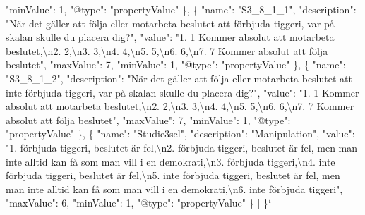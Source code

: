 \documentclass[
]{book}
\newenvironment{Shaded}{\begin{snugshade}}{\end{snugshade}}
\newcommand{\CharTok}[1]{\textcolor[rgb]{0.31,0.60,0.02}{#1}}
\newcommand{\DataTypeTok}[1]{\textcolor[rgb]{0.13,0.29,0.53}{#1}}
\newcommand{\DecValTok}[1]{\textcolor[rgb]{0.00,0.00,0.81}{#1}}
\newcommand{\ErrorTok}[1]{\textcolor[rgb]{0.64,0.00,0.00}{\textbf{#1}}}
\newcommand{\FunctionTok}[1]{\textcolor[rgb]{0.00,0.00,0.00}{#1}}
\newcommand{\OtherTok}[1]{\textcolor[rgb]{0.56,0.35,0.01}{#1}}
\newcommand{\StringTok}[1]{\textcolor[rgb]{0.31,0.60,0.02}{#1}}
\begin{document}
\begin{Shaded}
\begin{Highlighting}[]
      \DataTypeTok{"minValue"}\FunctionTok{:} \DecValTok{1}\FunctionTok{,}
      \DataTypeTok{"@type"}\FunctionTok{:} \StringTok{"propertyValue"}
    \FunctionTok{\}}\OtherTok{,}
    \FunctionTok{\{}
      \DataTypeTok{"name"}\FunctionTok{:} \StringTok{"S3_8_1_1"}\FunctionTok{,}
      \DataTypeTok{"description"}\FunctionTok{:} \StringTok{"När det gäller att följa eller motarbeta beslutet att förbjuda tiggeri, var på skalan skulle du placera dig?"}\FunctionTok{,}
      \DataTypeTok{"value"}\FunctionTok{:} \StringTok{"1. 1 Kommer absolut att motarbeta beslutet,}\CharTok{\textbackslash{}n}\StringTok{2. 2,}\CharTok{\textbackslash{}n}\StringTok{3. 3,}\CharTok{\textbackslash{}n}\StringTok{4. 4,}\CharTok{\textbackslash{}n}\StringTok{5. 5,}\CharTok{\textbackslash{}n}\StringTok{6. 6,}\CharTok{\textbackslash{}n}\StringTok{7. 7 Kommer absolut att följa beslutet"}\FunctionTok{,}
      \DataTypeTok{"maxValue"}\FunctionTok{:} \DecValTok{7}\FunctionTok{,}
      \DataTypeTok{"minValue"}\FunctionTok{:} \DecValTok{1}\FunctionTok{,}
      \DataTypeTok{"@type"}\FunctionTok{:} \StringTok{"propertyValue"}
    \FunctionTok{\}}\OtherTok{,}
    \FunctionTok{\{}
      \DataTypeTok{"name"}\FunctionTok{:} \StringTok{"S3_8_1_2"}\FunctionTok{,}
      \DataTypeTok{"description"}\FunctionTok{:} \StringTok{"När det gäller att följa eller motarbeta beslutet att inte förbjuda tiggeri, var på skalan skulle du placera dig?"}\FunctionTok{,}
      \DataTypeTok{"value"}\FunctionTok{:} \StringTok{"1. 1 Kommer absolut att motarbeta beslutet,}\CharTok{\textbackslash{}n}\StringTok{2. 2,}\CharTok{\textbackslash{}n}\StringTok{3. 3,}\CharTok{\textbackslash{}n}\StringTok{4. 4,}\CharTok{\textbackslash{}n}\StringTok{5. 5,}\CharTok{\textbackslash{}n}\StringTok{6. 6,}\CharTok{\textbackslash{}n}\StringTok{7. 7 Kommer absolut att följa beslutet"}\FunctionTok{,}
      \DataTypeTok{"maxValue"}\FunctionTok{:} \DecValTok{7}\FunctionTok{,}
      \DataTypeTok{"minValue"}\FunctionTok{:} \DecValTok{1}\FunctionTok{,}
      \DataTypeTok{"@type"}\FunctionTok{:} \StringTok{"propertyValue"}
    \FunctionTok{\}}\OtherTok{,}
    \FunctionTok{\{}
      \DataTypeTok{"name"}\FunctionTok{:} \StringTok{"Studie3sel"}\FunctionTok{,}
      \DataTypeTok{"description"}\FunctionTok{:} \StringTok{"Manipulation"}\FunctionTok{,}
      \DataTypeTok{"value"}\FunctionTok{:} \StringTok{"1. förbjuda tiggeri, beslutet är fel,}\CharTok{\textbackslash{}n}\StringTok{2. förbjuda tiggeri, beslutet är fel, men man inte alltid kan få som man vill i en demokrati,}\CharTok{\textbackslash{}n}\StringTok{3. förbjuda tiggeri,}\CharTok{\textbackslash{}n}\StringTok{4. inte förbjuda tiggeri, beslutet är fel,}\CharTok{\textbackslash{}n}\StringTok{5. inte förbjuda tiggeri, beslutet är fel, men man inte alltid kan få som man vill i en demokrati,}\CharTok{\textbackslash{}n}\StringTok{6. inte förbjuda tiggeri"}\FunctionTok{,}
      \DataTypeTok{"maxValue"}\FunctionTok{:} \DecValTok{6}\FunctionTok{,}
      \DataTypeTok{"minValue"}\FunctionTok{:} \DecValTok{1}\FunctionTok{,}
      \DataTypeTok{"@type"}\FunctionTok{:} \StringTok{"propertyValue"}
    \FunctionTok{\}}
  \OtherTok{]}
\FunctionTok{\}}\ErrorTok{`}
\end{Highlighting}
\end{Shaded}
\end{document}
